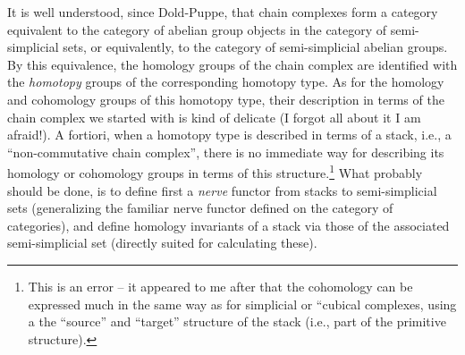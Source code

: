 It is well understood, since Dold-Puppe, that chain complexes form a
category equivalent to the category of abelian group objects in the
category of semi-simplicial sets, or equivalently, to the category of
semi-simplicial abelian groups. By this equivalence, the homology
groups of the chain complex are identified with the \emph{homotopy}
groups of the corresponding homotopy type. As for the homology and
cohomology groups of this homotopy type, their description in terms of
the chain complex we started with is kind of delicate (I forgot all
about it I am afraid!). A fortiori, when a homotopy type is described
in terms of a stack, i.e., a ``non-commutative chain complex'', there
is no immediate way for describing its homology or cohomology groups
in terms of this structure.\footnote{ This is an
  error -- it appeared to me after that the cohomology can be
  expressed much in the same way as for simplicial or ``cubical
  complexes, using a   the ``source'' and
  ``target'' structure of the stack (i.e., part of the primitive
  structure).} What probably should be done, is to define first a
\emph{nerve} functor from stacks to semi-simplicial sets (generalizing
the familiar nerve functor defined on the category of categories), and
define homology invariants of a stack via those of the associated
semi-simplicial set (directly suited for calculating these).

